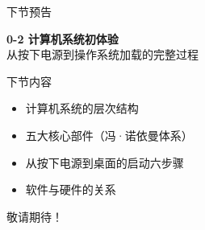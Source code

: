 \documentclass[10pt, aspectratio=169]{beamer}
\begin{document}
\begin{frame}{下节预告}
    \begin{center}
    \vspace{1em}
    {\Large \textbf{0-2 计算机系统初体验}}\\
    \vspace{0.3em}
    \textcolor{408blue}{从按下电源到操作系统加载的完整过程}
    \vspace{1em}
    \end{center}
    \begin{block}{下节内容}
        \begin{itemize}
            \item 计算机系统的层次结构
            \item 五大核心部件（冯·诺依曼体系）
            \item 从按下电源到桌面的启动六步骤
            \item 软件与硬件的关系
        \end{itemize}
    \end{block}
    \vspace{0.5em}
    \begin{center}
        \textcolor{408orange}{敬请期待！}
    \end{center}
\end{frame}
\end{document}
